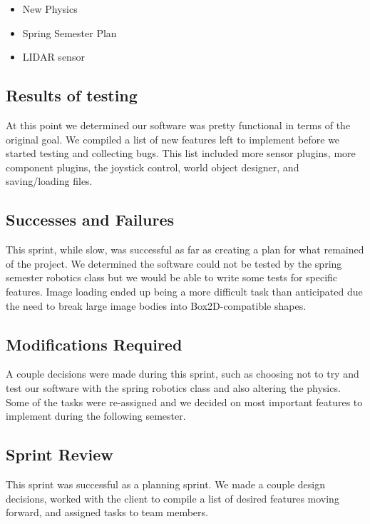 \begin{itemize}
	\item New Physics
	\item Spring Semester Plan
	\item LIDAR sensor
\end{itemize}

\subsection{Results of testing}

At this point we determined our software was pretty functional in terms of the original goal. We compiled a list of new features left to implement before we started testing and collecting bugs. This list included more sensor plugins, more component plugins, the joystick control, world object designer, and saving/loading files.

\subsection{Successes and Failures}

This sprint, while slow, was successful as far as creating a plan for what remained of the project. We determined the software could not be tested by the spring semester robotics class but we would be able to write some tests for specific features. Image loading ended up being a more difficult task than anticipated due the need to break large image bodies into Box2D-compatible shapes.

\subsection{Modifications Required}

A couple decisions were made during this sprint, such as choosing not to try and test our software with the spring robotics class and also altering the physics. Some of the tasks were re-assigned and we decided on most important features to implement during the following semester.

\subsection{Sprint Review}

This sprint was successful as a planning sprint. We made a couple design decisions, worked with the client to compile a list of desired features moving forward, and assigned tasks to team members.

